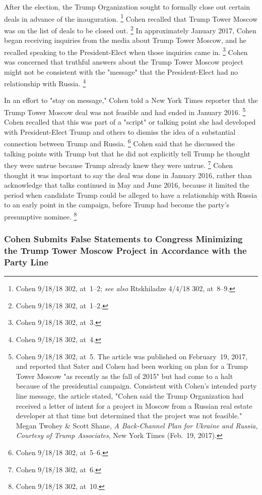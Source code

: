 After the election, the Trump Organization sought to formally close out certain deals in advance of the inauguration.%
\footnote{Cohen 9/18/18 302, at~1--2;
\textit{see also} Rtskhiladze 4/4/18 302, at~8--9.}
Cohen recalled that Trump Tower Moscow was on the list of deals to be closed out.%
\footnote{Cohen 9/18/18 302, at~1--2.}
In approximately January 2017, Cohen began receiving inquiries from the media about Trump Tower Moscow, and he recalled speaking to the President-Elect when those inquiries came in.%
\footnote{Cohen 9/18/18 302, at~3.}
Cohen was concerned that truthful answers about the Trump Tower Moscow project might not be consistent with the "message" that the President-Elect had no relationship with Russia.%
\footnote{Cohen 9/18/18 302, at~4.}

In an effort to "stay on message," Cohen told a New York Times reporter that the Trump Tower Moscow deal was not feasible and had ended in January 2016.%
\footnote{Cohen 9/18/18 302, at~5.
The article was published on February~19, 2017, and reported that Sater and Cohen had been working on plan for a Trump Tower Moscow "as recently as the fall of 2015" but had come to a halt because of the presidential campaign.
Consistent with Cohen's intended party line message, the article stated, "Cohen said the Trump Organization had received a letter of intent for a project in Moscow from a Russian real estate developer at that time but determined that the project was not feasible."
Megan Twohey \& Scott Shane, \textit{A Back-Channel Plan for Ukraine and Russia, Courtesy of Trump Associates}, New York Times (Feb.~19, 2017).}
Cohen recalled that this was part of a "script" or talking point she had developed with President-Elect Trump and others to dismiss the idea of a substantial connection between Trump and Russia.%
\footnote{Cohen 9/18/18 302, at~5--6.}
Cohen said that he discussed the talking points with Trump but that he did not explicitly tell Trump he thought they were untrue because Trump already knew they were untrue.%
\footnote{Cohen 9/18/18 302, at~6.}
Cohen thought it was important to say the deal was done in January 2016, rather than acknowledge that talks continued in May and June 2016, because it limited the period when candidate Trump could be alleged to have a relationship with Russia to an early point in the campaign, before Trump had become the party's presumptive nominee.%
\footnote{Cohen 9/18/18 302, at~10.}

\subsubsection{Cohen Submits False Statements to Congress Minimizing the Trump Tower Moscow Project in Accordance with the Party Line}

